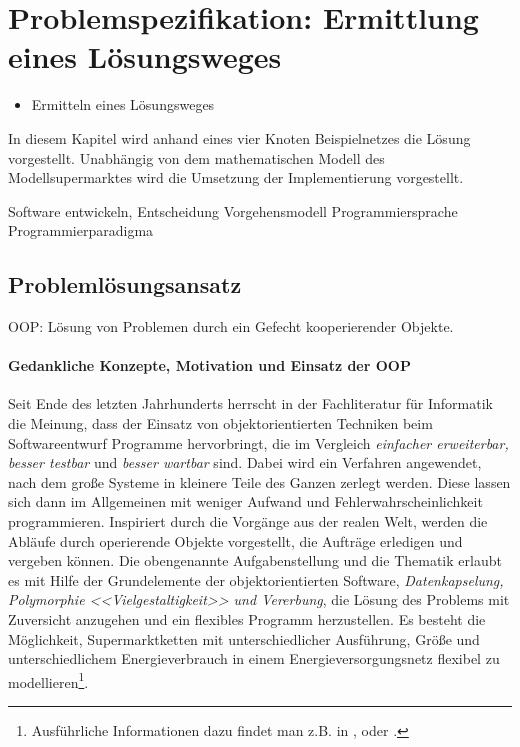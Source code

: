 \chapter{Problemspezifikation: Ermittlung eines Lösungsweges}
\label{chap:problemspezifikation}
\minitoc
\begin{itemize}
\item Ermitteln eines Lösungsweges
\end{itemize}
In diesem Kapitel wird anhand eines vier Knoten Beispielnetzes die Lösung
vorgestellt. Unabhängig von dem mathematischen Modell des Modellsupermarktes
wird die Umsetzung der Implementierung vorgestellt.

Software entwickeln, Entscheidung Vorgehensmodell Programmiersprache
Programmierparadigma

\section{Problemlösungsansatz}

OOP: Lösung von Problemen durch ein
Gefecht kooperierender Objekte.\cite{java}
\subsubsection*{Gedankliche Konzepte, Motivation und Einsatz der OOP}
Seit Ende des letzten Jahrhunderts herrscht in der Fachliteratur für Informatik
die Meinung, dass der Einsatz von objektorientierten Techniken beim
Softwareentwurf Programme hervorbringt, die im Vergleich \textit{einfacher
erweiterbar, besser testbar} und \textit{besser wartbar} sind. Dabei wird ein Verfahren angewendet, nach dem große Systeme in
kleinere Teile des Ganzen zerlegt werden. Diese lassen sich dann im Allgemeinen
mit weniger Aufwand und Fehlerwahrscheinlichkeit programmieren. Inspiriert durch
die Vorgänge aus der realen Welt, werden die Abläufe durch operierende Objekte
vorgestellt, die Aufträge erledigen und vergeben können.  Die obengenannte
Aufgabenstellung und die Thematik erlaubt es mit Hilfe der Grundelemente der
objektorientierten Software,
\textit{Datenkapselung, Polymorphie <<Vielgestaltigkeit>> und Vererbung}, die
Lösung des Problems mit Zuversicht anzugehen und ein flexibles Programm
herzustellen. Es besteht die Möglichkeit, Supermarktketten mit unterschiedlicher
Ausführung, Größe und unterschiedlichem Energieverbrauch in einem
Energieversorgungsnetz flexibel zu modellieren\footnote{ Ausführliche
Informationen dazu findet man z.B. in \cite{OOP},\cite{java} oder
\cite{python}.}.


